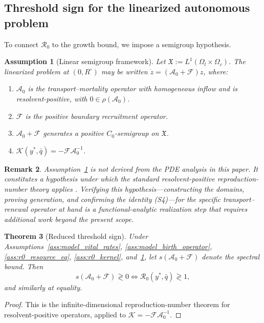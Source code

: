 \documentclass[pdflatex,sn-mathphys-num]{sn-jnl}%
\newtheorem{theorem}{Theorem}[section]
\newtheorem{assumption}[theorem]{Assumption}
\newtheorem{remark}[theorem]{Remark}
\begin{document}
\subsection{Threshold sign for the linearized autonomous problem}
To connect \(\mathcal R_0\) to the growth bound, we impose a semigroup hypothesis.
\begin{assumption}[Linear semigroup framework]\label{ass:r0_semigroup}
Let \(\mathfrak X:=L^1(\Omega_l\times\Omega_c)\). The linearized problem at
\((0,R^\circ)\) may be written
\(\dot z=(\mathcal A_0+\mathcal F)z\), where:
\begin{enumerate}[label=\textup{(S\arabic*)}]
\item \(\mathcal A_0\) is the transport--mortality operator with homogeneous inflow
and is resolvent-positive, with \(0\in\rho(\mathcal A_0)\).
\item \(\mathcal F\) is the positive boundary recruitment operator.
\item \(\mathcal A_0+\mathcal F\) generates a positive \(C_0\)-semigroup on
\(\mathfrak X\).
\item \(\mathcal K(y^\ast,\bar q)=-\mathcal F\mathcal A_0^{-1}\).
\end{enumerate}
\end{assumption}

\begin{remark}\label{rem:semigroup_conditional}
Assumption~\ref{ass:r0_semigroup} is \emph{not} derived from the PDE analysis in this paper. It
constitutes a hypothesis under which the standard resolvent-positive reproduction-number
theory applies \cite{Thieme2009,yu2026microscopic,AniKuzoBanasiak2019}. Verifying this hypothesis---constructing the domains, proving
generation, and confirming the identity (S4)---for the specific transport--renewal
operator at hand is a functional-analytic realization step that requires additional
work beyond the present scope.
\end{remark}

\begin{theorem}[Reduced threshold sign]\label{thm:r0_sign}
Under Assumptions~\ref{ass:model_vital_rates}, \ref{ass:model_birth_operator}, \ref{ass:r0_resource_eq}, \ref{ass:r0_kernel}, and~\ref{ass:r0_semigroup},
let \(s(\mathcal A_0+\mathcal F)\) denote the spectral bound. Then
\begin{equation}\label{eq:r0_sign}
s(\mathcal A_0+\mathcal F)\gtrless 0
\iff
\mathcal R_0(y^\ast,\bar q)\gtrless 1,
\end{equation}
and similarly at equality.
\end{theorem}
\begin{proof}
This is the infinite-dimensional reproduction-number theorem for resolvent-positive
operators, applied to \(\mathcal K=-\mathcal F\mathcal A_0^{-1}\).
\end{proof}
\end{document}
